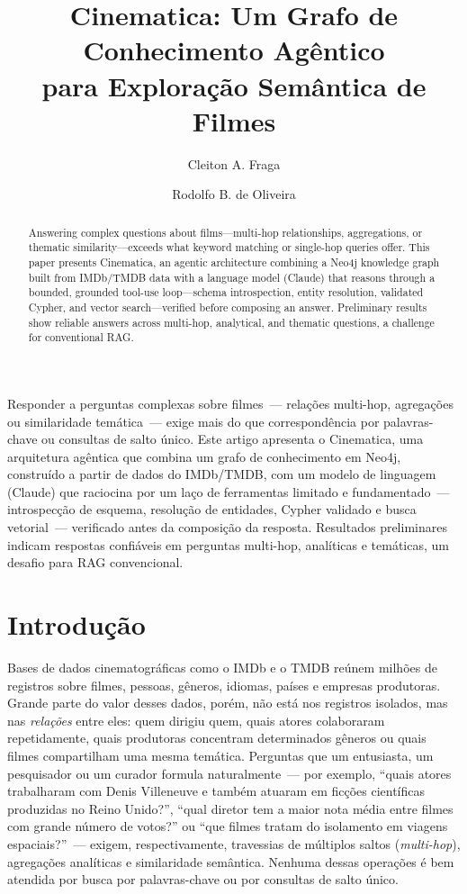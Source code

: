 \documentclass[12pt]{article}
\title{Cinematica: Um Grafo de Conhecimento Agêntico\\
       para Exploração Semântica de Filmes}
\author{Cleiton A. Fraga\inst{1} \and Rodolfo B. de Oliveira\inst{1}}
\begin{document}
\maketitle

\begin{abstract}
    Answering complex questions about films---multi-hop relationships, aggregations, or thematic similarity---exceeds what keyword matching or single-hop queries offer. This paper presents Cinematica, an agentic architecture combining a Neo4j knowledge graph built from IMDb/TMDB data with a language model (Claude) that reasons through a bounded, grounded tool-use loop---schema introspection, entity resolution, validated Cypher, and vector search---verified before composing an answer. Preliminary results show reliable answers across multi-hop, analytical, and thematic questions, a challenge for conventional RAG.
\end{abstract}

\begin{resumo}
    Responder a perguntas complexas sobre filmes~--- relações multi-hop, agregações ou similaridade temática~--- exige mais do que correspondência por palavras-chave ou consultas de salto único. Este artigo apresenta o Cinematica, uma arquitetura agêntica que combina um grafo de conhecimento em Neo4j, construído a partir de dados do IMDb/TMDB, com um modelo de linguagem (Claude) que raciocina por um laço de ferramentas limitado e fundamentado~--- introspecção de esquema, resolução de entidades, Cypher validado e busca vetorial~--- verificado antes da composição da resposta. Resultados preliminares indicam respostas confiáveis em perguntas multi-hop, analíticas e temáticas, um desafio para RAG convencional.
\end{resumo}

\section{Introdução}
\label{sec:introducao}
    Bases de dados cinematográficas como o IMDb e o TMDB reúnem milhões de registros sobre filmes, pessoas, gêneros, idiomas, países e empresas produtoras. Grande parte do valor desses dados, porém, não está nos registros isolados, mas nas \emph{relações} entre eles: quem dirigiu quem, quais atores colaboraram repetidamente, quais produtoras concentram determinados gêneros ou quais filmes compartilham uma mesma temática. Perguntas que um entusiasta, um pesquisador ou um curador formula naturalmente~--- por exemplo, ``quais atores trabalharam com Denis Villeneuve e também atuaram em ficções científicas produzidas no Reino Unido?'', ``qual diretor tem a maior nota média entre filmes com grande número de votos?'' ou ``que filmes tratam do isolamento em viagens espaciais?''~--- exigem, respectivamente, travessias de múltiplos saltos (\emph{multi-hop}), agregações analíticas e similaridade semântica. Nenhuma dessas operações é bem atendida por busca por palavras-chave ou por consultas de salto único.
    
\end{document}
